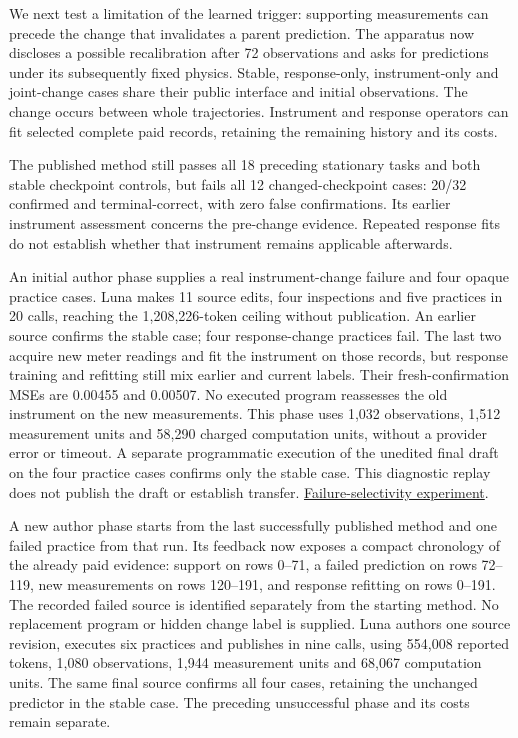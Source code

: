 \documentclass[11pt,a4paper]{article}
\begin{document}
We next test a limitation of the learned trigger: supporting measurements can
precede the change that invalidates a parent prediction. The apparatus now
discloses a possible recalibration after 72 observations and asks for predictions
under its subsequently fixed physics. Stable, response-only, instrument-only and
joint-change cases share their public interface and initial observations. The
change occurs between whole trajectories. Instrument and response operators can
fit selected complete paid records, retaining the remaining history and its costs.


The published method still passes all 18 preceding stationary tasks and both
stable checkpoint controls, but fails all 12 changed-checkpoint cases: 20/32
confirmed and terminal-correct, with zero false confirmations. Its earlier
instrument assessment concerns the pre-change evidence. Repeated response fits
do not establish whether that instrument remains applicable afterwards.


An initial author phase supplies a real instrument-change failure and four opaque
practice cases. Luna makes 11 source edits, four inspections and five practices
in 20 calls, reaching the 1,208,226-token ceiling without publication. An earlier
source confirms the stable case; four response-change practices fail. The last
two acquire new meter readings and fit the instrument on those records, but
response training and refitting still mix earlier and current labels. Their
fresh-confirmation MSEs are 0.00455 and 0.00507. No executed program reassesses
the old instrument on the new measurements. This phase uses 1,032 observations,
1,512 measurement units and 58,290 charged computation units, without a provider
error or timeout. A separate programmatic execution of the unedited final draft
on the four practice cases confirms only the stable case. This diagnostic replay
does not publish the draft or establish transfer.
\hyperlink{artifact-71}{Failure-selectivity experiment}.


A new author phase starts from the last successfully published method and one
failed practice from that run. Its feedback now exposes a compact chronology of
the already paid evidence: support on rows 0–71, a failed prediction on rows
72–119, new measurements on rows 120–191, and response refitting on rows 0–191.
The recorded failed source is identified separately from the starting method.
No replacement program or hidden change label is supplied. Luna authors one
source revision, executes six practices and publishes in nine calls, using
554,008 reported tokens, 1,080 observations, 1,944 measurement units and 68,067
computation units. The same final source confirms all four cases, retaining the
unchanged predictor in the stable case. The preceding unsuccessful phase and
its costs remain separate.
\end{document}
